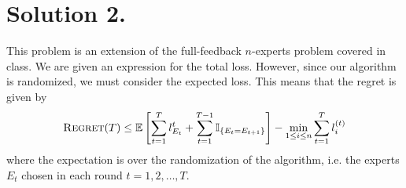 \documentclass[11pt]{article}
\begin{document}
\section*{Solution 2.}
This problem is an extension of the full-feedback $n$-experts problem covered in class.
We are given an expression for the total loss. However, since our algorithm is randomized,
we must consider the expected loss. This means that the regret is given by
\begin{equation}
    \label{eq:rand-regret}
    \textsc{Regret}(T) \leq \mathbb{E}\left[ \sum_{t=1}^{T} l_{E_{t}}^{t} + \sum_{t=1}^{T-1} \mathbb{I}_{\{E_{t} = E_{t+1}\}} \right] - \min_{1 \leq i \leq n} \sum_{t=1}^{T} l_{i}^{(t)}
\end{equation}
where the expectation is over the randomization of the algorithm, i.e. the experts $E_{t}$
chosen in each round $t = 1, 2, \ldots, T$.
\end{document}
